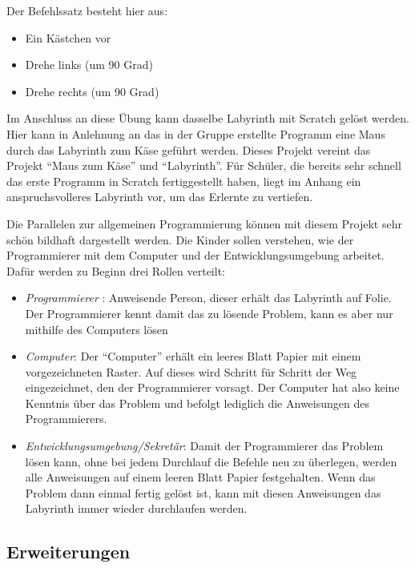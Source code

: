 Der Befehlssatz besteht hier aus:

\begin{itemize}
\item
  Ein Kästchen vor
\item
  Drehe links (um 90 Grad)
\item
  Drehe rechts (um 90 Grad)
\end{itemize}

Im Anschluss an diese Übung kann dasselbe Labyrinth mit Scratch gelöst
werden. Hier kann in Anlehnung an das in der Gruppe erstellte Programm
eine Maus durch das Labyrinth zum Käse geführt werden. Dieses Projekt
vereint das Projekt ``Maus zum Käse'' und ``Labyrinth''. Für Schüler,
die bereits sehr schnell das erste Programm in Scratch fertiggestellt
haben, liegt im Anhang ein anspruchsvolleres Labyrinth vor, um das
Erlernte zu vertiefen.

Die Parallelen zur allgemeinen Programmierung können mit diesem Projekt
sehr schön bildhaft dargestellt werden. Die Kinder sollen verstehen, wie
der Programmierer mit dem Computer und der Entwicklungsumgebung
arbeitet. Dafür werden zu Beginn drei Rollen verteilt:

\begin{itemize}
\item
  \emph{Programmierer} : Anweisende Person, dieser erhält das Labyrinth
  auf Folie. Der Programmierer kennt damit das zu lösende Problem, kann
  es aber nur mithilfe des Computers lösen
\item
  \emph{Computer}: Der ``Computer'' erhält ein leeres Blatt Papier mit
  einem vorgezeichneten Raster. Auf dieses wird Schritt für Schritt der
  Weg eingezeichnet, den der Programmierer vorsagt. Der Computer hat
  also keine Kenntnis über das Problem und befolgt lediglich die
  Anweisungen des Programmierers.
\item
  \emph{Entwicklungsumgebung/Sekretär}: Damit der Programmierer das
  Problem lösen kann, ohne bei jedem Durchlauf die Befehle neu zu
  überlegen, werden alle Anweisungen auf einem leeren Blatt Papier
  festgehalten. Wenn das Problem dann einmal fertig gelöst ist, kann mit
  diesen Anweisungen das Labyrinth immer wieder durchlaufen werden.
\end{itemize}

\subsection{Erweiterungen}\label{erweiterungen}

